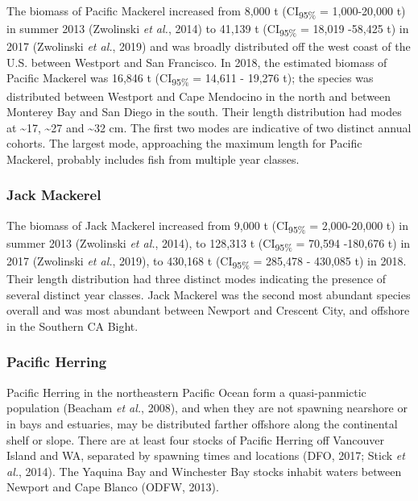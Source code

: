 \documentclass[]{article}
\begin{document}
The biomass of Pacific Mackerel increased from 8,000 t (CI\textsubscript{95\%} = 1,000-20,000 t) in summer 2013 (Zwolinski \emph{et al.}, 2014) to 41,139 t (CI\textsubscript{95\%} = 18,019 -58,425 t) in 2017 (Zwolinski \emph{et al.}, 2019) and was broadly distributed off the west coast of the U.S. between Westport and San Francisco. In 2018, the estimated biomass of Pacific Mackerel was 16,846 t (CI\textsubscript{95\%} = 14,611 - 19,276 t); the species was distributed between Westport and Cape Mendocino in the north and between Monterey Bay and San Diego in the south. Their length distribution had modes at \textasciitilde17, \textasciitilde27 and \textasciitilde32 cm. The first two modes are indicative of two distinct annual cohorts. The largest mode, approaching the maximum length for Pacific Mackerel, probably includes fish from multiple year classes.

\hypertarget{discussion-jack}{%
\subsubsection{Jack Mackerel}\label{discussion-jack}}

The biomass of Jack Mackerel increased from 9,000 t (CI\textsubscript{95\%} = 2,000-20,000 t) in summer 2013 (Zwolinski \emph{et al.}, 2014), to 128,313 t (CI\textsubscript{95\%} = 70,594 -180,676 t) in 2017 (Zwolinski \emph{et al.}, 2019), to 430,168 t (CI\textsubscript{95\%} = 285,478 - 430,085 t) in 2018. Their length distribution had three distinct modes indicating the presence of several distinct year classes. Jack Mackerel was the second most abundant species overall and was most abundant between Newport and Crescent City, and offshore in the Southern CA Bight.

\hypertarget{discussion-herring}{%
\subsubsection{Pacific Herring}\label{discussion-herring}}

Pacific Herring in the northeastern Pacific Ocean form a quasi-panmictic population (Beacham \emph{et al.}, 2008), and when they are not spawning nearshore or in bays and estuaries, may be distributed farther offshore along the continental shelf or slope. There are at least four stocks of Pacific Herring off Vancouver Island and WA, separated by spawning times and locations (DFO, 2017; Stick \emph{et al.}, 2014). The Yaquina Bay and Winchester Bay stocks inhabit waters between Newport and Cape Blanco (ODFW, 2013).
\end{document}
